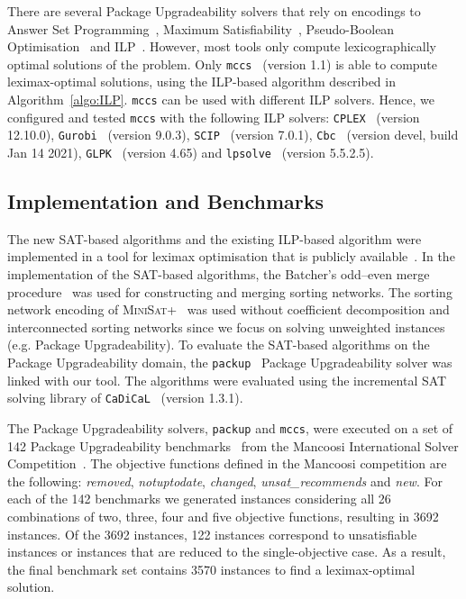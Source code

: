 \documentclass[a4paper,UKenglish,cleveref, autoref, thm-restate]{lipics-v2021}
\begin{document}
There are several Package Upgradeability solvers that rely on encodings to Answer Set Programming~\cite{aspcud}, Maximum Satisfiability~\cite{Janota2012,Janota2014}, Pseudo-Boolean Optimisation~\cite{inesc-and-p2cudf} and ILP~\cite{milp2010, mancoosi-del-4.3}.
However, most tools only compute lexicographically optimal solutions of the problem. Only \texttt{mccs}~\cite{mccs-webpage,milp2010} (version 1.1) is able to compute leximax-optimal solutions, using the ILP-based algorithm described in Algorithm~\ref{algo:ILP}.
\texttt{mccs} can be used with different ILP solvers. Hence, we configured and tested \texttt{mccs} with the following ILP solvers: \texttt{CPLEX}~\cite{cplex-webpage} (version 12.10.0), \texttt{Gurobi}~\cite{gurobi-webpage} (version 9.0.3), \texttt{SCIP}~\cite{scip,scip-webpage} (version 7.0.1), \texttt{Cbc}~\cite{cbc-webpage} (version devel, build Jan 14 2021), \texttt{GLPK}~\cite{glpk-webpage} (version 4.65) and \texttt{lpsolve}~\cite{lpsolve-webpage} (version 5.5.2.5).

\subsection{Implementation and Benchmarks}

The new SAT-based algorithms and the existing ILP-based algorithm were implemented in a tool for leximax optimisation that is publicly available~\cite{leximaxIST}. 
In the implementation of the SAT-based algorithms, the Batcher's odd–even merge procedure~\cite{batcher,knuth1997art} was used for constructing and merging sorting networks.
The sorting network encoding of \textsc{MiniSat+}~\cite{DBLP:journals/jsat/EenS06} was used  without coefficient decomposition and interconnected sorting networks since we focus on solving unweighted instances (e.g. Package Upgradeability).
To evaluate the SAT-based algorithms on the Package Upgradeability domain, the \texttt{packup}~\cite{Janota2012,Janota2014,packup-webpage} Package Upgradeability solver was linked with our tool.
The algorithms were evaluated using the incremental SAT solving library of \texttt{CaDiCaL}~\cite{cadical} (version 1.3.1).

The Package Upgradeability solvers, \texttt{packup} and \texttt{mccs}, were executed on a set of 142 Package Upgradeability benchmarks~\cite{benchmarks_packup} from the Mancoosi International Solver Competition~\cite{mancoosi-competition}.
The objective functions defined in the Mancoosi competition are the following: \textit{removed}, \textit{notuptodate}, \textit{changed}, \textit{unsat\_recommends} and \textit{new}.
For each of the 142 benchmarks we generated instances considering all 26 combinations of two, three, four and five objective functions, resulting in 3692 instances.
Of the 3692 instances, 122 instances correspond to unsatisfiable instances or instances that are reduced to the single-objective case. As a result, the final benchmark set contains 3570 instances to find a leximax-optimal solution.
\end{document}
